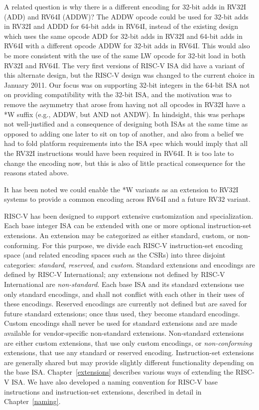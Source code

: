 \begin{commentary}
A related question is why there is a different encoding for 32-bit
adds in RV32I (ADD) and RV64I (ADDW)? The ADDW opcode could be used
for 32-bit adds in RV32I and ADDD for 64-bit adds in RV64I, instead of
the existing design which uses the same opcode ADD for 32-bit adds in
RV32I and 64-bit adds in RV64I with a different opcode ADDW for 32-bit
adds in RV64I.  This would also be more consistent with the use of the
same LW opcode for 32-bit load in both RV32I and RV64I.  The very
first versions of RISC-V ISA did have a variant of this alternate
design, but the RISC-V design was changed to the current choice in
January 2011.  Our focus was on supporting 32-bit integers in the
64-bit ISA not on providing compatibility with the 32-bit ISA, and the
motivation was to remove the asymmetry that arose from having not all
opcodes in RV32I have a *W suffix (e.g., ADDW, but AND not ANDW).  In
hindsight, this was perhaps not well-justified and a consequence of
designing both ISAs at the same time as opposed to adding one later to
sit on top of another, and also from a belief we had to fold platform
requirements into the ISA spec which would imply that all the RV32I
instructions would have been required in RV64I.  It is too late to
change the encoding now, but this is also of little practical
consequence for the reasons stated above.

It has been noted we could enable the *W variants as an extension to
RV32I systems to provide a common encoding across RV64I and a future
RV32 variant.
\end{commentary}

RISC-V has been designed to support extensive customization and
specialization.  Each base integer ISA can be extended with one or
more optional instruction-set extensions.  An extension may be
categorized as either standard, custom, or non-conforming.
For this purpose, we divide each RISC-V
instruction-set encoding space (and related encoding spaces such as
the CSRs) into three disjoint categories: {\em standard}, {\em
  reserved}, and {\em custom}.  Standard extensions and encodings
are defined by RISC-V International; any extensions not defined by
RISC-V International are {\em non-standard}.
Each base ISA and its standard extensions use only standard encodings,
and shall not conflict with each other in their uses of these encodings.
Reserved encodings are currently not defined but are saved for future
standard extensions; once thus used, they become standard encodings.
Custom encodings shall never be used for standard extensions and are
made available for vendor-specific non-standard extensions.
Non-standard extensions are either custom extensions, that use only
custom encodings, or {\em non-conforming} extensions, that use any
standard or reserved encoding.
Instruction-set extensions are generally shared but may provide slightly different
functionality depending on the base ISA.  Chapter~\ref{extensions}
describes various ways of extending the RISC-V ISA.  We have also
developed a naming convention for RISC-V base instructions and
instruction-set extensions, described in detail in
Chapter~\ref{naming}.

